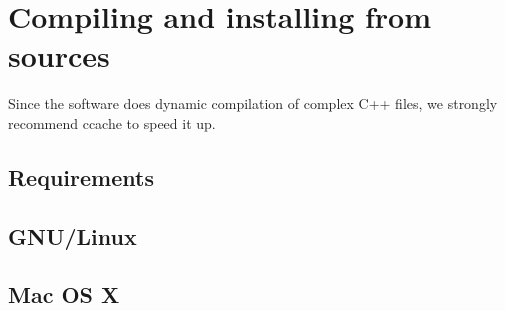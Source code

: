 \section{Compiling and installing from sources}
Since the software does dynamic compilation of complex C++ files, we strongly
recommend ccache to speed it up.

\subsection{Requirements}

\subsection{GNU/Linux}
\subsection{Mac OS X}

\label{assume-we-build-in-the-source-directory}
